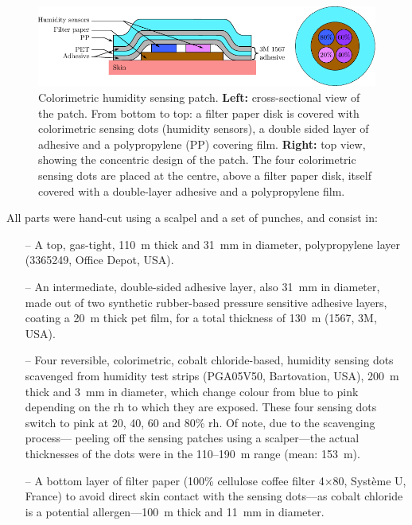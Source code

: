\begin{figure}
	\centering
	\includegraphics{1_main_matter/tcco2_figures/humid_patch_schem.pdf}
	\caption[Colorimetric humidity sensing patch schematic.]{Colorimetric humidity sensing patch. \textbf{Left:} cross-sectional view of the patch. From bottom to top: a filter paper disk is covered with colorimetric sensing dots (humidity sensors), a double sided layer of adhesive and a polypropylene (PP) covering film. \textbf{Right:} top view, showing the concentric design of the patch. The four colorimetric sensing dots are placed at the centre, above a filter paper disk, itself covered with a double-layer adhesive and a polypropylene film.}
	\label{fig:tcco2:humid_principle}
\end{figure}

All parts were hand-cut using a scalpel and a set of punches, and consist in:
\begin{itemize}
	\item[--] A top, gas-tight, 110~{\textmu}m thick and 31~mm in diameter, polypropylene layer (3365249, Office Depot, USA).
	\item[--] An intermediate, double-sided adhesive layer, also 31~mm in diameter, made out of two synthetic rubber-based pressure sensitive adhesive layers, coating a 20~{\textmu}m thick \gls{pet} film, for a total thickness of 130~{\textmu}m (1567, 3M, USA).
	\item[--] Four reversible, colorimetric, cobalt chloride-based, humidity sensing dots scavenged from humidity test strips (PGA05V50, Bartovation, USA), 200~{\textmu}m thick and 3~mm in diameter, which change colour from blue to pink depending on the \gls{rh} to which they are exposed. These four sensing dots switch to pink at 20, 40, 60 and 80\% \gls{rh}. Of note, due to the scavenging process---\ie{} peeling off the sensing patches using a scalper---the actual thicknesses of the dots were in the 110--190~{\textmu}m range (mean: 153~{\textmu}m).
	\item[--] A bottom layer of filter paper (100\% cellulose coffee filter {\textnumero}4$\times$80, Système U, France) to avoid direct skin contact with the sensing dots---as cobalt chloride is a potential allergen\cite{zug2009, thyssen2012}---100~{\textmu}m thick and 11~mm in diameter.
\end{itemize}

